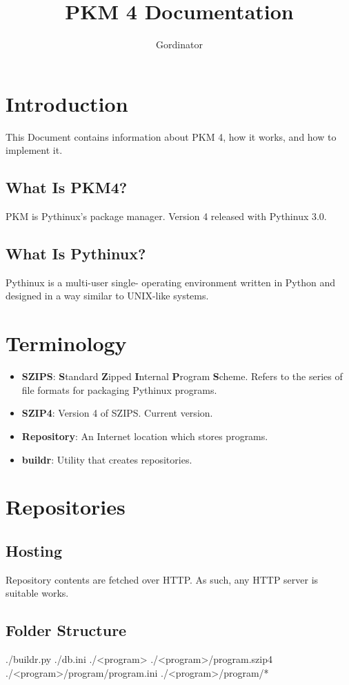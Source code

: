 \documentclass[english,12pt,a4paper]{article}
\title{PKM 4 Documentation}
\author{Gordinator}
\begin{document}
	\maketitle
	\tableofcontents
	\section{Introduction}
	This Document contains information about PKM 4, how it works, and how to implement it.
	\subsection{What Is PKM4?}
	PKM is Pythinux's package manager. Version 4 released with Pythinux 3.0.
	\subsection{What Is Pythinux?}
	Pythinux is a multi-user single- operating environment written in Python and designed in a way similar to UNIX-like systems. 
	\section{Terminology}
	\begin{itemize}
		\item \textbf{SZIPS}: \textbf{S}tandard \textbf{Z}ipped \textbf{I}nternal \textbf{P}rogram \textbf{S}cheme. Refers to the series of file formats for packaging Pythinux programs.
		\item \textbf{SZIP4}: Version 4 of SZIPS. Current version.
		\item \textbf{Repository}: An Internet location which stores programs.
		\item \textbf{buildr}: Utility that creates repositories.
	\end{itemize}
	\section{Repositories}
	\subsection{Hosting}
	Repository contents are fetched over HTTP. As such, any HTTP server is suitable works.
	\subsection{Folder Structure}
	\begin{ffcode}
		./buildr.py
		./db.ini
		./<program>
		./<program>/program.szip4
		./<program>/program/program.ini
		./<program>/program/*
	\end{ffcode}
\end{document}
